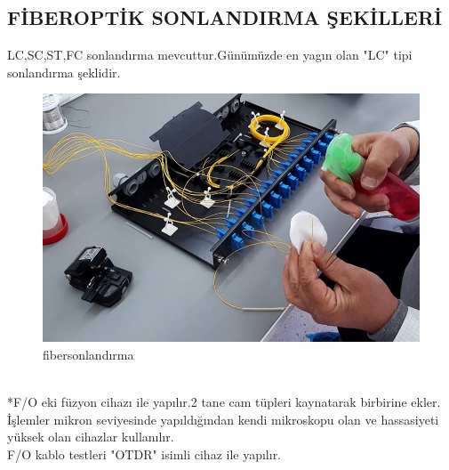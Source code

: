 \subsection*{FİBEROPTİK SONLANDIRMA ŞEKİLLERİ}
LC,SC,ST,FC sonlandırma mevcuttur.Günümüzde en yagın olan "LC" tipi sonlandırma şeklidir.\\
\begin{figure}[!ht]
  \includegraphics{images/Fiber-Optik-Ek-ve-Sonlandirma}
 \caption{fibersonlandırma}
 \label{fig:fosonlandırma}
\end{figure}
\\
*F/O eki füzyon cihazı ile yapılır.2 tane cam tüpleri kaynatarak birbirine ekler.\\
İşlemler mikron seviyesinde yapıldığından kendi mikroskopu olan ve hassasiyeti yüksek olan cihazlar kullanılır. \\
F/O kablo testleri "OTDR" isimli cihaz  ile yapılır.
